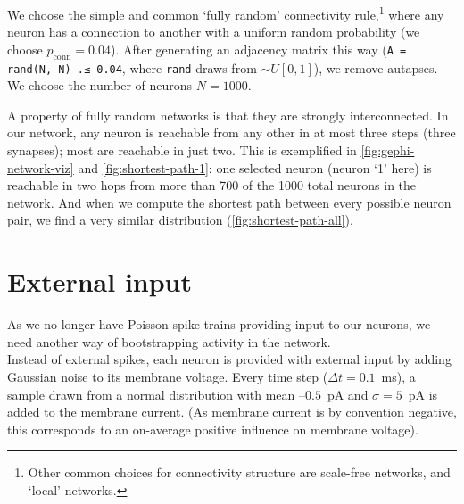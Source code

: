 
We choose the simple and common `fully random' connectivity rule,\footnote{
    Other common choices for connectivity structure are scale-free networks, and `local' networks.
}
where any neuron has a connection to another with a uniform random probability (we choose $p_\text{conn} = 0.04$). After generating an adjacency matrix this way (\verb|A = rand(N, N) .≤ 0.04|, where \verb|rand| draws from $\sim U[0,1]$), we remove autapses. We choose the number of neurons $N = 1000$.

A property of fully random networks is that they are strongly interconnected. In our network, any neuron is reachable from any other in at most three steps (three synapses); most are reachable in just two. This is exemplified in \cref{fig:gephi-network-viz} and \cref{fig:shortest-path-1}: one selected neuron (neuron `1' here) is reachable in two hops from more than 700 of the 1000 total neurons in the network. And when we compute the shortest path between every possible neuron pair, we find a very similar distribution (\cref{fig:shortest-path-all}).




\section{External input}

As we no longer have Poisson spike trains providing input to our neurons, we need another way of bootstrapping activity in the network.\\
Instead of external spikes, each neuron is provided with external input by adding Gaussian noise to its membrane voltage. Every time step ($Δt = 0.1$~ms), a sample drawn from a normal distribution with mean $–0.5$~pA and $σ = 5$~pA is added to the membrane current. (As membrane current is by convention negative, this corresponds to an on-average positive influence on membrane voltage).



